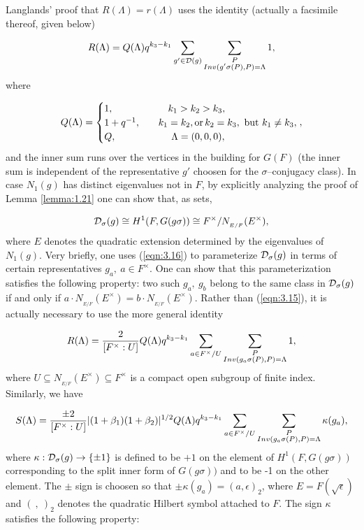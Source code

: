 \documentclass[12pt,letterpaper]{article}
\def\ddd{{\cal D}}
\begin{document}
Langlands' proof that $R(\Lambda )=r(\Lambda )$ uses the identity (actually
a facsimile thereof, given below)

\begin{equation}
\label{eqn:3.15}
R(\Lambda )=Q(\Lambda )q^{k_3-k_1}\sum_{g'\in \ddd (g)}
\sum_{\substack{P\\Inv(g'\sigma (P),P)=\Lambda}} 1,
\end{equation}
where

\[
Q(\Lambda )=
\begin{cases} 1,&\ \ \ \ \ \ k_1>k_2>k_3,\\
1+q^{-1},&\ \ \ k_1=k_2, {\rm  or  }\, k_2=k_3,\ {\rm  but }\ k_1\not= k_3,\\
Q,&\ \ \ \ \ \ \ \Lambda = (0,0,0),
\end{cases} ,
\]
and the inner sum runs over the vertices in the building for
$G(F)$ (the inner sum is independent of the representative $g'$ choosen 
for the $\sigma$--conjugacy class). In case $N_1(g)$ has distinct
eigenvalues not in $F$, by explicitly analyzing the proof of Lemma 
\ref{lemma:1.21} one
can show that, as sets,

\begin{equation}
\label{eqn:3.16}
\ddd_{\sigma}(g) \cong H^1(F,G(g\sigma )) 
\cong F^{\times}/N_{_{E/F}}(E^{\times}),
\end{equation}
where $E$ denotes the quadratic extension determined 
by the eigenvalues of $N_1(g)$. 
Very briefly, one uses (\ref{eqn:3.16}) 
to parameterize $\ddd_{\sigma}(g)$
in terms of certain representatives $g_a,\ a\in F^{\times}$. 
One can
show that this parameterization satisfies the following property:
two such $g_a,\ g_b$ belong to the same class in $\ddd_\sigma (g)$ 
if and only if
$a\cdot N_{_{E/F}}(E^{\times})=b\cdot N_{_{E/F}}(E^{\times})$. 
Rather than (\ref{eqn:3.15}), it is actually 
necessary to use the more general identity

\begin{equation}
\label{eqn:3.17}
R(\Lambda )={2\over{[F^{\times}:U]}}
Q(\Lambda )q^{k_3-k_1}\sum_{a\in F^{\times}/U}
\sum_{\substack{ P\\Inv(g_a\sigma (P),P)=\Lambda}} 1,
\end{equation}
where $U\subseteq N_{_{E/F}}(E^{\times})\subseteq F^{\times}$
is a compact open subgroup of finite index. Similarly, we have

\begin{equation}
\label{eqn:3.18}
S(\Lambda )={\pm 2\over{[F^{\times}:U]}}|(1+\beta_1)(1+\beta_2)|^{1/2}
Q(\Lambda )q^{k_3-k_1}\sum_{a\in F^{\times}/U}
\sum_{\substack{P\\Inv(g_a\sigma (P),P)=\Lambda}} 
\kappa (g_a),
\end{equation}
where $\kappa :\ddd_{\sigma }(g) \rightarrow \{\pm 1\}$
is defined to be $+1$ on the element of $H^1(F,G(g\sigma ))$
corresponding to the split inner form of $G(g\sigma ))$ and to be
-1 on the other element. The $\pm$ sign is choosen so that 
$\pm\kappa(g_a)=(a,\epsilon)_2$, where $E=F(\sqrt{\epsilon})$
and $(\ ,\ )_2$ denotes the quadratic Hilbert symbol
attached to $F$. The sign $\kappa$ satisfies the following property:
\end{document}
